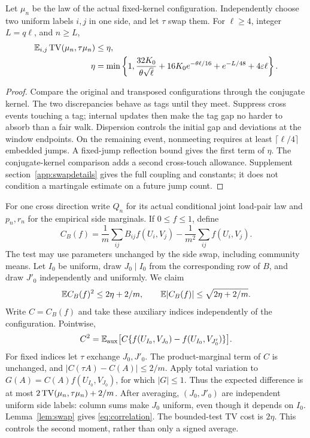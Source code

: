 \begin{lemma}\label{lem:swap}
Let $\mu_n$ be the law of the actual fixed-kernel configuration. Independently choose two uniform labels $i,j$ in one side, and let $\tau$ swap them. For $\ell\ge4$, integer $L=q\ell$, and $n\ge L$,
\begin{align}
 \mathbb E_{i,j}\operatorname{TV}(\mu_n,\tau\mu_n)&\le\eta,\label{eq:eta}\\
 \eta&=\min\left\{1,\frac{32K_0}{\theta\sqrt\ell}
 +16K_0e^{-\theta\ell/16}+e^{-L/48}+4\varepsilon\ell\right\}.\nonumber
\end{align}
\end{lemma}
\begin{proof}
Compare the original and transposed configurations through the conjugate
kernel. The two discrepancies behave as tags until they meet.
Suppress cross events touching a tag; internal updates then make the tag gap
no harder to absorb than a fair walk. Dispersion controls the initial gap
and deviations at the window endpoints. On the remaining event, nonmeeting
requires at least $\lceil\ell/4\rceil$ embedded jumps.
A fixed-jump reflection bound gives the first term of $\eta$.
The conjugate-kernel comparison adds a second cross-touch allowance.
Supplement section~\ref*{app:swapdetails} gives the full coupling and constants;
it does not condition a martingale estimate on a future jump count.
\end{proof}

For one cross direction write $Q_n$ for its actual conditional joint load-pair law and $p_n,r_n$ for the empirical side marginals. If $0\le f\le1$, define
\[
 C_B(f)=\frac1m\sum_{ij}B_{ij}f(U_i,V_j)
       -\frac1{m^2}\sum_{ij}f(U_i,V_j).
\]
The test may use parameters unchanged by the side swap, including community
means. Let $I_0$ be uniform, draw $J_0\mid I_0$ from the corresponding row
of $B$, and draw $J'_0$ independently and uniformly. We claim
\begin{equation}\label{eq:correlation}
 \mathbb E C_B(f)^2\le2\eta+2/m,
 \qquad \mathbb E|C_B(f)|\le\sqrt{2\eta+2/m}.
\end{equation}
Write $C=C_B(f)$ and take these auxiliary indices independently of the
configuration. Pointwise,
\[
 C^2=\mathbb E_{\rm aux}\bigl[C\{f(U_{I_0},V_{J_0})-f(U_{I_0},V_{J'_0})\}\bigr].
\]
For fixed indices let $\tau$ exchange $J_0,J'_0$. The product-marginal term of $C$ is unchanged, and $|C(\tau A)-C(A)|\le2/m$. Apply total variation to $G(A)=C(A)f(U_{I_0},V_{J_0})$, for which $|G|\le1$. Thus the expected difference is at most $2\operatorname{TV}(\mu_n,\tau\mu_n)+2/m$. After averaging, $(J_0,J'_0)$ are independent uniform side labels: column sums make $J_0$ uniform, even though it depends on $I_0$. Lemma~\ref{lem:swap} gives \eqref{eq:correlation}. The bounded-test TV cost is $2\eta$. This controls the second moment, rather than only a signed average.

